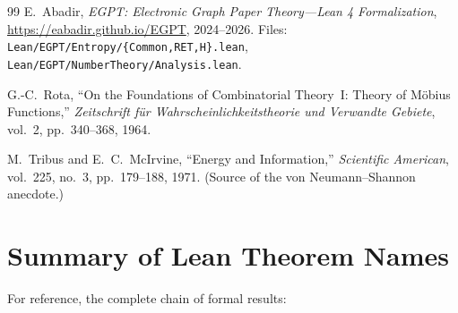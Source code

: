 \documentclass[12pt,a4paper]{article}
\theoremstyle{definition}
\begin{document}
\begin{thebibliography}{99}
E.~Abadir,
\textit{EGPT: Electronic Graph Paper Theory---Lean 4 Formalization},
\url{https://eabadir.github.io/EGPT},
2024--2026.
Files: \texttt{Lean/EGPT/Entropy/\{Common,RET,H\}.lean},
\texttt{Lean/EGPT/NumberTheory/Analysis.lean}.

G.-C.~Rota,
``On the Foundations of Combinatorial Theory~I: Theory of M\"obius
Functions,''
\textit{Zeitschrift f\"ur Wahrscheinlichkeitstheorie und Verwandte
Gebiete}, vol.~2, pp.~340--368, 1964.

M.~Tribus and E.~C.~McIrvine,
``Energy and Information,''
\textit{Scientific American}, vol.~225, no.~3, pp.~179--188, 1971.
(Source of the von Neumann--Shannon anecdote.)

\end{thebibliography}

\appendix

\section{Summary of Lean Theorem Names}
\label{app:lean}

For reference, the complete chain of formal results:

\bigskip
\end{document}
